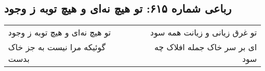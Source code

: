 \begin{center}
\section*{رباعی شماره ۶۱۵: تو هیچ نه‌ای و هیچ توبه ز وجود}
\label{sec:0615}
\begin{longtable}{l p{0.5cm} r}
تو هیچ نه‌ای و هیچ توبه ز وجود
&&
تو غرق زیانی و زیانت همه سود
\\
گوئیکه مرا نیست به جز خاک بدست
&&
ای بر سر خاک جمله افلاک چه سود
\\
\end{longtable}
\end{center}
